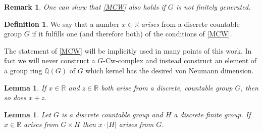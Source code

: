 \documentclass[12pt,a4paper]{scrartcl}
\theoremstyle{plain}
\newtheorem{Lemma}[Theorem]{Lemma}
\newtheorem{Remark}[Theorem]{Remark}
\theoremstyle{definition}
\newtheorem{Definition}[Theorem]{Definition}
\numberwithin{equation}{section}
\newcommand{\R}{\mathbb{R}} %
\newcommand{\Q}{\mathbb{Q}} %
\newcommand{\2}{\mathbb{Z} / 2 \mathbb{Z}}
\newcommand{\1}{\bar{1}}
\newcommand{\0}{\bar{0}}
\begin{document}
\begin{Remark}
	One can show that \ref{MCW} also holds if $G$ is not finitely generated.
\end{Remark}
\begin{Definition}
	We say that a number $x \in \R$ \emph{arises} from a discrete countable group $G$ if it fulfills one (and therefore both) of the conditions of \ref{MCW}.
\end{Definition}
The statement of \ref{MCW} will be implicitly used in many points of this work. In fact we will never construct a $G$-Cw-complex and instead construct an element of a group ring $\Q (G)$ of $G$ which kernel has the desired von Neumann dimension.


\begin{Lemma}\label{add}
	If $x \in \R$ and $z \in \R$ both arise from a discrete, countable group $G$, then so does $x + z$.
\end{Lemma}
\begin{Lemma}\label{mult}
	Let $G$ is a discrete countable group and $H$ a discrete finite group. If $x \in \R$ arises from $G \times H$ then $x \cdot |H|$ arises from $G$.
\end{Lemma}
\end{document}
